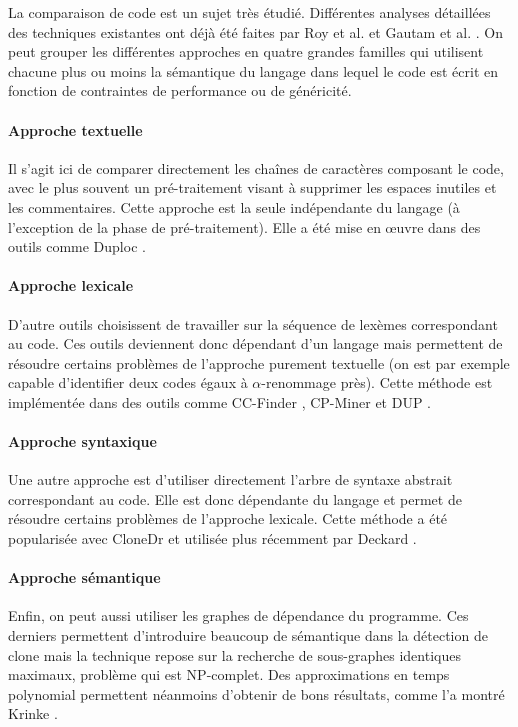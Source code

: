 La comparaison de code est un sujet très étudié.  Différentes
analyses détaillées des techniques existantes ont déjà été faites par
Roy et al. \cite{ComparisonAndEvaluation} et Gautam et
al. \cite{variousCodeClone}.  On peut grouper les différentes
approches en quatre grandes familles qui utilisent chacune plus ou
moins la sémantique du langage dans lequel le code est écrit en fonction
de contraintes de performance ou de généricité.

\paragraph{Approche textuelle}
Il s'agit ici de comparer directement les chaînes de caractères
composant le code, avec le plus souvent un pré-traitement visant à
supprimer les espaces inutiles et les commentaires. Cette approche est
la seule indépendante du langage (à l'exception de la phase de
pré-traitement). Elle a été mise en œuvre dans des outils comme Duploc
\cite{ALanguageIndependent}.

\paragraph{Approche lexicale}
D'autre outils choisissent de travailler sur la séquence de lexèmes
correspondant au code. Ces outils deviennent donc dépendant d'un
langage mais permettent de résoudre certains problèmes de l'approche
purement textuelle (on est par exemple capable d'identifier deux codes
égaux à $\alpha$-renommage près).  Cette méthode est implémentée dans
des outils comme CC-Finder \cite{ccfinder}, CP-Miner \cite{cpminer} et
DUP \cite{dup}.

\paragraph{Approche syntaxique}
Une autre approche est d'utiliser directement l'arbre de syntaxe
abstrait correspondant au code. Elle est donc dépendante du langage et
permet de résoudre certains problèmes de l'approche lexicale. Cette
méthode a été popularisée avec CloneDr \cite{CloneDetectionUsingAST}
et utilisée plus récemment par Deckard \cite{Deckard}.

\paragraph{Approche sémantique}
Enfin, on peut aussi utiliser les graphes de dépendance
\cite{PdgOrigin} du programme. Ces derniers permettent d'introduire
beaucoup de sémantique dans la détection de clone mais la technique
repose sur la recherche de sous-graphes identiques maximaux, problème
qui est NP-complet. Des approximations en temps polynomial permettent
néanmoins d'obtenir de bons résultats, comme l'a montré Krinke
\cite{PDG}.
